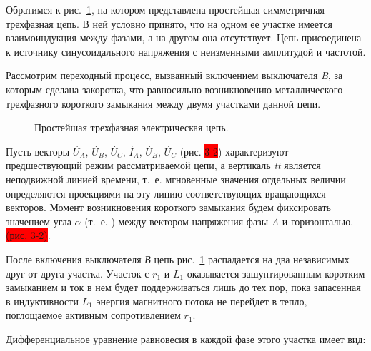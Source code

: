 Обратимся к рис.~\ref{ris:3-1 simple_3_phase_circut}, на котором представлена простейшая симметричная трехфазная цепь. В ней условно принято, что на одном ее участке имеется взаимоиндукция между фазами, а на другом она отсутствует. Цепь присоединена к источнику синусоидального напряжения с неизменными амплитудой и частотой.

Рассмотрим переходный процесс, вызванный включением выключателя \textit{B}, за которым сделана закоротка, что равносильно возникновению металлического трехфазного короткого замыкания между двумя участками данной цепи.

\begin{figure}[h]
	\caption{Простейшая трехфазная электрическая цепь.}
	\label{ris:3-1 simple_3_phase_circut}
\end{figure}

Пусть векторы $ \overset{\;.}{U}_A $, $ \overset{\;.}{U}_B $, $ \overset{\;.}{U}_C $, $ \overset{\;.}{I}_A $, $ \overset{\;.}{U}_B $, $ \overset{\;.}{U}_C $ (рис. \colorbox{red}{3-2})
характеризуют предшествующий режим рассматриваемой цепи, а вертикаль \textit{tt} является неподвижной линией времени, т.~е. мгновенные значения отдельных величии определяются проекциями на эту линию соответствующих вращающихся векторов. Момент возникновения короткого замыкания будем фиксировать значением угла $ \alpha $ (т.~е. ) между вектором напряжения фазы \textit{A} и горизонталью. \colorbox{red}{(рис. 3-2)}.

После включения выключателя \textit{В} цепь рис.~\ref{ris:3-1 simple_3_phase_circut} распадается на два независимых друг от друга участка. Участок с $ r_1 $ и $ L_1 $ оказывается зашунтированным коротким замыканием и ток в нем будет поддерживаться лишь до тех пор, пока запасенная в индуктивности $ L_1 $ энергия магнитного потока не перейдет в тепло, поглощаемое активным сопротивлением $ r_1 $.

Дифференциальное уравнение равновесия в каждой фазе этого участка имеет вид:

